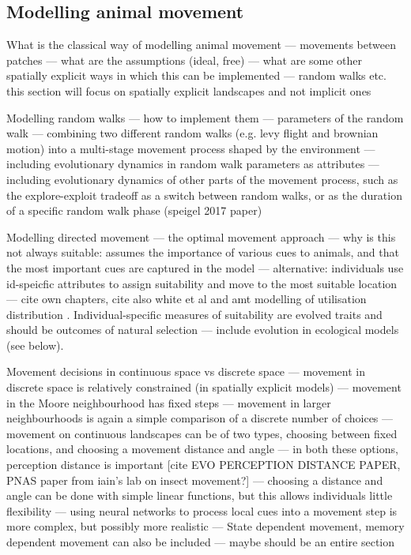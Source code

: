 \subsection*{Modelling animal movement}

What is the classical way of modelling animal movement --- movements between patches --- what are the assumptions (ideal, free) --- what are some other spatially explicit ways in which this can be implemented --- random walks etc. this section will focus on spatially explicit landscapes and not implicit ones

Modelling random walks --- how to implement them --- parameters of the random walk --- combining two different random walks (e.g. levy flight and brownian motion) into a multi-stage movement process shaped by the environment --- including evolutionary dynamics in random walk parameters as attributes --- including evolutionary dynamics of other parts of the movement process, such as the explore-exploit tradeoff as a switch between random walks, or as the duration of a specific random walk phase (speigel 2017 paper)

Modelling directed movement --- the optimal movement approach \citep{scherer2020} --- why is this not always suitable: assumes the importance of various cues to animals, and that the most important cues are captured in the model --- alternative: individuals use id-speicfic attributes to assign suitability and move to the most suitable location --- cite own chapters, cite also white et al and amt modelling of utilisation distribution \citep{signer2017,signer2019}. 
Individual-specific measures of suitability are evolved traits and should be outcomes of natural selection --- include evolution in ecological models (see below).

Movement decisions in continuous space vs discrete space --- movement in discrete space is relatively constrained (in spatially explicit models) --- movement in the Moore neighbourhood has fixed steps --- movement in larger neighbourhoods is again a simple comparison of a discrete number of choices --- movement on continuous landscapes can be of two types, choosing between fixed locations, and choosing a movement distance and angle --- in both these options, perception distance is important [cite EVO PERCEPTION DISTANCE PAPER, PNAS paper from iain's lab on insect movement?] --- choosing a distance and angle can be done with simple linear functions, but this allows individuals little flexibility --- using neural networks to process local cues into a movement step is more complex, but possibly more realistic \cite*{mueller2011} --- State dependent movement, memory dependent movement can also be included --- maybe should be an entire section


